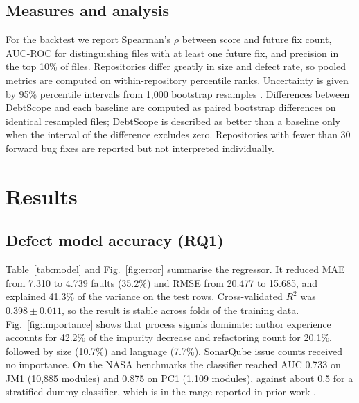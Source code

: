 \documentclass[conference]{IEEEtran}
\begin{document}
\subsection{Measures and analysis}
For the backtest we report Spearman's $\rho$ between score and future fix count, AUC-ROC for distinguishing files with at least one future fix, and precision in the top 10\% of files. Repositories differ greatly in size and defect rate, so pooled metrics are computed on within-repository percentile ranks. Uncertainty is given by 95\% percentile intervals from 1,000 bootstrap resamples \cite{efron}. Differences between DebtScope and each baseline are computed as paired bootstrap differences on identical resampled files; DebtScope is described as better than a baseline only when the interval of the difference excludes zero. Repositories with fewer than 30 forward bug fixes are reported but not interpreted individually.

\section{Results}
\subsection{Defect model accuracy (RQ1)}
Table~\ref{tab:model} and Fig.~\ref{fig:error} summarise the regressor. It reduced MAE from 7.310 to 4.739 faults (35.2\%) and RMSE from 20.477 to 15.685, and explained 41.3\% of the variance on the test rows. Cross-validated $R^2$ was $0.398\pm0.011$, so the result is stable across folds of the training data. Fig.~\ref{fig:importance} shows that process signals dominate: author experience accounts for 42.2\% of the impurity decrease and refactoring count for 20.1\%, followed by size (10.7\%) and language (7.7\%). SonarQube issue counts received no importance. On the NASA benchmarks the classifier reached AUC 0.733 on JM1 (10,885 modules) and 0.875 on PC1 (1,109 modules), against about 0.5 for a stratified dummy classifier, which is in the range reported in prior work \cite{menzies,lessmann}.
\end{document}
